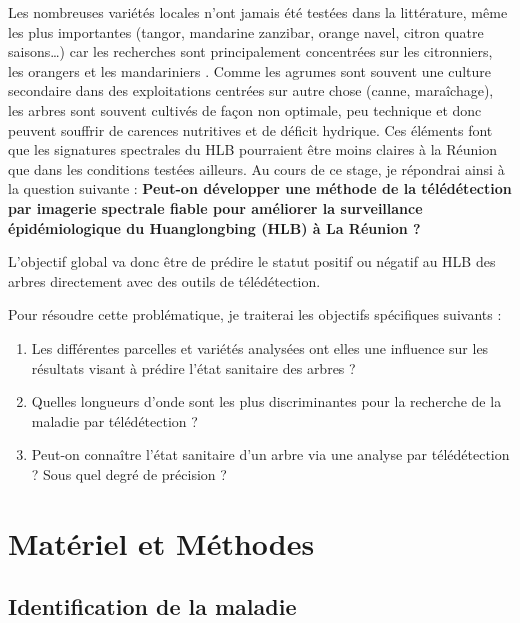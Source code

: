 \documentclass[
  11pt,
  french,
  a4paper,
  extrafontsizes,onecolumn,openright
  ]{memoir}
\providecommand{\tightlist}{%
  \setlength{\itemsep}{0pt}\setlength{\parskip}{0pt}}
\begin{document}
Les nombreuses variétés locales n'ont jamais été testées dans la littérature, même les plus importantes (tangor, mandarine zanzibar, orange navel, citron quatre saisons\ldots) car les recherches sont principalement concentrées sur les citronniers, les orangers et les mandariniers \autocite{sankaran_visible-near_2011} \autocite{deng_detection_2020}. Comme les agrumes sont souvent une culture secondaire dans des exploitations centrées sur autre chose (canne, maraîchage), les arbres sont souvent cultivés de façon non optimale, peu technique et donc peuvent souffrir de carences nutritives et de déficit hydrique. Ces éléments font que les signatures spectrales du HLB pourraient être moins claires à la Réunion que dans les conditions testées ailleurs. Au cours de ce stage, je répondrai ainsi à la question suivante : \textbf{Peut-on développer une méthode de la télédétection par imagerie spectrale fiable pour améliorer la surveillance épidémiologique du Huanglongbing (HLB) à La Réunion ?}

L'objectif global va donc être de prédire le statut positif ou négatif au HLB des arbres directement avec des outils de télédétection.

Pour résoudre cette problématique, je traiterai les objectifs spécifiques suivants :

\begin{enumerate}
\def\labelenumi{\arabic{enumi})}
\tightlist
\item
  Les différentes parcelles et variétés analysées ont elles une influence sur les résultats visant à prédire l'état sanitaire des arbres ?
\item
  Quelles longueurs d'onde sont les plus discriminantes pour la recherche de la maladie par télédétection ?
\item
  Peut-on connaître l'état sanitaire d'un arbre via une analyse par télédétection ? Sous quel degré de précision ?
\end{enumerate}

\hypertarget{matuxe9riel-et-muxe9thodes}{%
\chapter{Matériel et Méthodes}\label{matuxe9riel-et-muxe9thodes}}

\hypertarget{identification-de-la-maladie}{%
\section{Identification de la maladie}\label{identification-de-la-maladie}}
\end{document}
